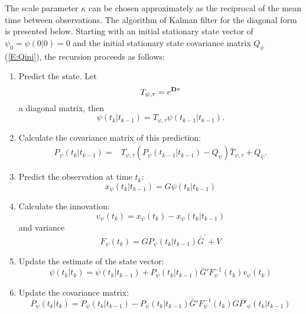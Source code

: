  The scale parameter $\kappa$ can be chosen approximately as the reciprocal of the mean time between observations. The algorithm of Kalman filter for the diagonal form is presented below. Starting with an initial stationary state vector of $\psi_0=\psi(0|0)=0$ and the initial stationary state covariance matrix $Q_{\psi}$ (\ref{E:Qini}), the recursion proceeds as follows:
   \begin{enumerate}\label{equ:diagpre}
    \item  Predict the state. Let
    \begin{equation}\label{E:carkal1d}
    T_{\psi,\tau}=e^{\bold{D}\tau}
    \end{equation}
    a diagonal matrix, then
    \begin{equation}
    \psi(t_k|t_{k-1})=T_{\psi,\tau}\psi(t_{k-1}|t_{k-1}).
    \end{equation}
    \item Calculate the covariance matrix of this prediction:  
\begin{align}
P_\psi(t_k|t_{k-1}) %
=&T_{\psi,\tau}(P_\psi(t_{k-1}|t_{k-1})-Q_\psi)\bar{T}_{\psi,\tau} +Q_\psi.
 \end{align}
    \item Predict the observation at time $t_k$:
    \begin{equation}\label{E:carkal4d}
    x_\psi(t_k|t_{k-1})=G\psi(t_k|t_{k-1})
    \end{equation}
    \item Calculate the innovation:
    \begin{equation}
    v_\psi(t_k)=x_\psi(t_k)-x_\psi(t_k|t_{k-1})
    \end{equation}
    and variance
     \begin{equation}
     F_\psi(t_k)=GP_\psi(t_k|t_{k-1})\bar{G}^{'}+V
     \end{equation}
    \item Update the estimate of the state vector:
     \begin{equation}
     \psi(t_k|t_k)=\psi(t_k|t_{k-1})+P_\psi(t_k|t_{k-1})\bar{G}'F_\psi^{-1}(t_k)v_\psi(t_k)
     \end{equation}
    \item Update the covariance matrix:
    \begin{equation}
    P_\psi(t_k|t_k)=P_\psi(t_k|t_{k-1})-P_\psi(t_k|t_{k-1})\bar{G}'F_\psi^{-1}(t_k)G\bar{P}'_\psi(t_k|t_{k-1})

\end{equation}
\end{enumerate}

